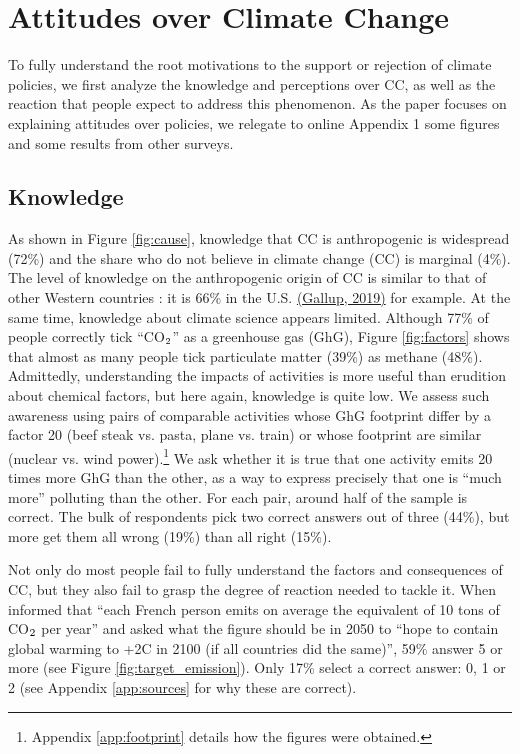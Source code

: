 \documentclass[english,5p,authoryear]{elsarticle}
\begin{document}
\section{Attitudes over Climate Change\label{sec:attitudes_climate_change}}
    
To fully understand the root motivations to the support or rejection of climate policies, we first analyze the knowledge and perceptions over CC, as well as the reaction that people expect to address this phenomenon. As the paper focuses on explaining attitudes over policies, we relegate to online Appendix 1 some figures and some results from other surveys.
    
    \subsection{Knowledge\label{subsec:knowledge}}
%
As shown in Figure \ref{fig:cause}, knowledge that CC is anthropogenic is widespread (72\%) and the share who do not believe in climate change (CC) is marginal (4\%). The level of knowledge on the anthropogenic origin of CC is similar to that of other Western countries \citep{leiserowitz_international_2007,lee_predictors_2015,stokes_global_2015-1}: it is 66\% in the U.S. \href{https://news.gallup.com/poll/1615/environment.aspx}{(Gallup, 2019)} for example. At the same time, knowledge about climate science appears limited. Although 77\% of people correctly tick ``CO$_\textnormal{2}$'' as a greenhouse gas (GhG), Figure \ref{fig:factors} shows that almost as many people tick particulate matter (39\%) as methane (48\%). Admittedly, understanding the impacts of activities is more useful than erudition about chemical factors, but here again, knowledge is quite low. We assess such awareness using pairs of comparable activities whose GhG footprint differ by a factor 20 (beef steak vs. pasta, plane vs. train) or whose footprint are similar (nuclear vs. wind power).\footnote{Appendix \ref{app:footprint} details how the figures were obtained.} We ask whether it is true that one activity emits 20 times more GhG than the other, as a way to express precisely that one is ``much more'' polluting than the other. For each pair, around half of the sample is correct. The bulk of respondents pick two correct answers out of three (44\%), but more get them all wrong (19\%) than all right (15\%). 

Not only do most people fail to fully understand the factors and consequences of CC, but they also fail to grasp the degree of reaction needed to tackle it. When informed that ``each French person emits on average the equivalent of 10 tons of CO$_\textnormal{2}$ per year'' and asked what the figure should be in 2050 to ``hope to contain global warming to +2\textdegree{}C in 2100 (if all countries did the same)'', 59\% answer 5 or more (see Figure \ref{fig:target_emission}). Only 17\% select a correct answer: 0, 1 or 2 (see Appendix \ref{app:sources} for why these are correct).
\end{document}
